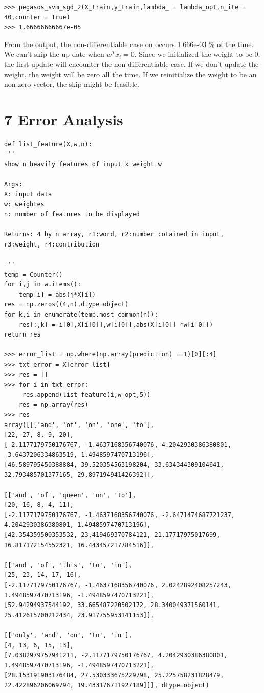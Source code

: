 \documentclass{article}
\begin{document}
\begin{verbatim}
>>> pegasos_svm_sgd_2(X_train,y_train,lambda_ = lambda_opt,n_ite = 40,counter = True)
>>> 1.66666666667e-05
\end{verbatim} 

From the output, the non-differentiable case on occurs 1.666e-03 \% of the time. We can't skip the up date when $w^Tx_i = 0$. Since we initialized the weight to be 0, the first update will encounter the non-differentiable case. If we don't update the weight, the weight will be zero all the time. If we reinitialize the weight to be an non-zero vector, the skip might be feasible. 

\section{7 Error Analysis}

\begin{verbatim}
def list_feature(X,w,n):
'''
show n heavily features of input x weight w

Args:
X: input data
w: weightes
n: number of features to be displayed

Returns: 4 by n array, r1:word, r2:number cotained in input, r3:weight, r4:contribution

'''
temp = Counter()
for i,j in w.items():
	temp[i] = abs(j*X[i])
res = np.zeros((4,n),dtype=object)
for k,i in enumerate(temp.most_common(n)):
	res[:,k] = i[0],X[i[0]],w[i[0]],abs(X[i[0]] *w[i[0]])
return res

>>> error_list = np.where(np.array(prediction) ==1)[0][:4]
>>> txt_error = X[error_list]
>>> res = []
>>> for i in txt_error:
   	 res.append(list_feature(i,w_opt,5))
    res = np.array(res)
>>> res
array([[['and', 'of', 'on', 'one', 'to'],
[22, 27, 8, 9, 20],
[-2.1177179750176767, -1.4637168356740076, 4.2042930386380801,
-3.6437206334863519, 1.4948597470713196],
[46.589795450388884, 39.520354563198204, 33.634344309104641,
32.793485701377165, 29.897194941426392]],

[['and', 'of', 'queen', 'on', 'to'],
[20, 16, 8, 4, 11],
[-2.1177179750176767, -1.4637168356740076, -2.6471474687721237,
4.2042930386380801, 1.4948597470713196],
[42.354359500353532, 23.419469370784121, 21.17717975017699,
16.817172154552321, 16.443457217784516]],

[['and', 'of', 'this', 'to', 'in'],
[25, 23, 14, 17, 16],
[-2.1177179750176767, -1.4637168356740076, 2.0242892408257243,
1.4948597470713196, -1.4948597470713221],
[52.94294937544192, 33.665487220502172, 28.340049371560141,
25.412615700212434, 23.917755953141153]],

[['only', 'and', 'on', 'to', 'in'],
[4, 13, 6, 15, 13],
[7.0382979757941211, -2.1177179750176767, 4.2042930386380801,
1.4948597470713196, -1.4948597470713221],
[28.153191903176484, 27.530333675229798, 25.225758231828479,
22.422896206069794, 19.433176711927189]]], dtype=object)
\end{verbatim}
\end{document}

